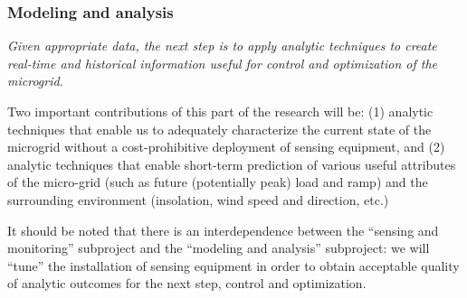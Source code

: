 
\subsubsection{Modeling and analysis}

{\em Given appropriate data, the next step is to apply analytic techniques
  to create real-time and historical information useful for control and
  optimization of the microgrid. 

  Two important contributions of this part of the 
  research will be: (1) analytic techniques that enable us to adequately
  characterize the current state of the microgrid without a
  cost-prohibitive deployment of sensing equipment, and (2) analytic
  techniques that enable short-term prediction of various useful attributes
  of the micro-grid (such as future (potentially peak) load and ramp) and
  the surrounding environment (insolation, wind speed and direction, etc.)

  It should be noted that there is an interdependence between the ``sensing
  and monitoring'' subproject and the ``modeling and analysis'' subproject:
  we will ``tune'' the installation of sensing equipment in order to obtain
  acceptable quality of analytic outcomes for the next step, control and
  optimization.  }


